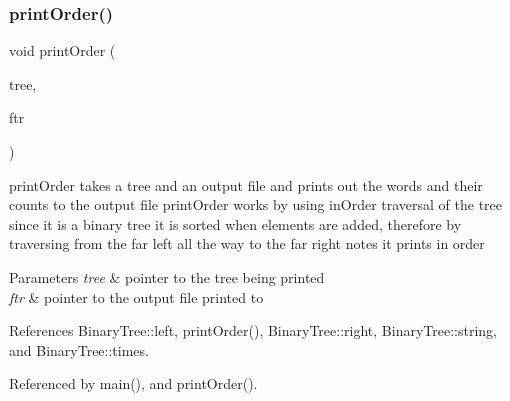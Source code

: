 \subsubsection{print\+Order()}
{\footnotesize\ttfamily void print\+Order (\begin{DoxyParamCaption}\item[{\textbf{ Binary\+Tree} $\ast$}]{tree,  }\item[{F\+I\+LE $\ast$}]{ftr }\end{DoxyParamCaption})}

print\+Order takes a tree and an output file and prints out the words and their counts to the output file print\+Order works by using in\+Order traversal of the tree since it is a binary tree it is sorted when elements are added, therefore by traversing from the far left all the way to the far right notes it prints in order 
\begin{DoxyParams}{Parameters}
{\em tree} & pointer to the tree being printed \\
\hline
{\em ftr} & pointer to the output file printed to \\
\hline
\end{DoxyParams}


References Binary\+Tree\+::left, print\+Order(), Binary\+Tree\+::right, Binary\+Tree\+::string, and Binary\+Tree\+::times.



Referenced by main(), and print\+Order().

